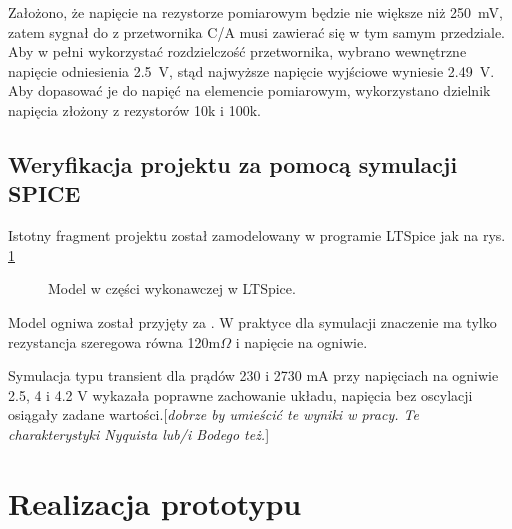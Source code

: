 \documentclass[polish,engineer]{polsl-msth}
\newcommand{\remark}[1]{{[\color{GREEN}\emph{\footnotesize #1}{}]}}
\begin{document}
Założono, że napięcie na rezystorze pomiarowym będzie nie większe niż 250~mV, zatem sygnał do z przetwornika C/A musi zawierać się w tym samym przedziale. Aby w pełni wykorzystać rozdzielczość przetwornika, wybrano wewnętrzne napięcie odniesienia 2.5~V, stąd najwyższe napięcie wyjściowe wyniesie 2.49~V. Aby dopasować je do napięć na elemencie pomiarowym, wykorzystano dzielnik napięcia złożony z rezystorów 10k i 100k.
\section{Weryfikacja projektu za pomocą symulacji SPICE}
Istotny fragment projektu został zamodelowany w programie LTSpice jak na rys. \ref{img:modelLTv1}
\begin{figure}[hbtp]
\centering
     \caption{Model w części wykonawczej w LTSpice. \label{img:modelLTv1}}
\end{figure}
Model ogniwa został przyjęty za \cite{8759769_cellmodel1storder}. W praktyce dla symulacji znaczenie ma tylko rezystancja szeregowa równa 120m$\Omega$ i napięcie na ogniwie.

Symulacja typu transient dla prądów 230 i 2730 mA przy napięciach na ogniwie 2.5, 4 i 4.2 V wykazała poprawne zachowanie układu, napięcia bez oscylacji osiągały zadane wartości.\remark{dobrze by umieścić te wyniki w pracy. Te charakterystyki Nyquista lub/i Bodego też.}

\chapter{Realizacja prototypu}
\end{document}
